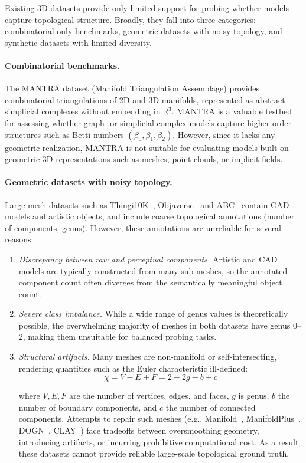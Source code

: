 Existing 3D datasets provide only limited support for probing whether models capture topological structure. Broadly, they fall into three categories: combinatorial-only benchmarks, geometric datasets with noisy topology, and synthetic datasets with limited diversity.

\paragraph{Combinatorial benchmarks.}
The MANTRA dataset (Manifold Triangulation Assemblage) \cite{mantra} provides combinatorial triangulations of 2D and 3D manifolds, represented as abstract simplicial complexes without embedding in $\mathbb{R}^3$. MANTRA is a valuable testbed for assessing whether graph- or simplicial complex models capture higher-order structures such as Betti numbers $(\beta_0, \beta_1, \beta_2)$. However, since it lacks any geometric realization, MANTRA is not suitable for evaluating models built on geometric 3D representations such as meshes, point clouds, or implicit fields.



\paragraph{Geometric datasets with noisy topology.}
Large mesh datasets such as Thingi10K~\cite{thingi}, Objaverse~\cite{objaverse} and ABC~\cite{abc} contain CAD models and artistic objects, and include coarse topological annotations (number of components, genus). However, these annotations are unreliable for several reasons:

\begin{enumerate}
  \item \textit{Discrepancy between raw and perceptual components.} Artistic and CAD models are typically constructed from many sub-meshes, so the annotated component count often diverges from the semantically meaningful object count.
  \item \textit{Severe class imbalance.} While a wide range of genus values is theoretically possible, the overwhelming majority of meshes in both datasets have genus 0–2, making them unsuitable for balanced probing tasks.
  \item \textit{Structural artifacts.} Many meshes are non-manifold or self-intersecting, rendering quantities such as the Euler characteristic ill-defined:
\begin{equation}
  \chi = V - E + F = 2 - 2g - b + c
  \label{eq:euler}
\end{equation}

where $V,E,F$ are the number of vertices, edges, and faces, $g$ is genus, $b$ the number of boundary components, and $c$ the number of connected components.
Attempts to repair such meshes (e.g., Manifold~\cite{manifold}, ManifoldPlus~\cite{manifoldplus}, DOGN~\cite{dogn}, CLAY~\cite{clay}) face tradeoffs between oversmoothing geometry, introducing artifacts, or incurring prohibitive computational cost. As a result, these datasets cannot provide reliable large-scale topological ground truth.
\end{enumerate}

